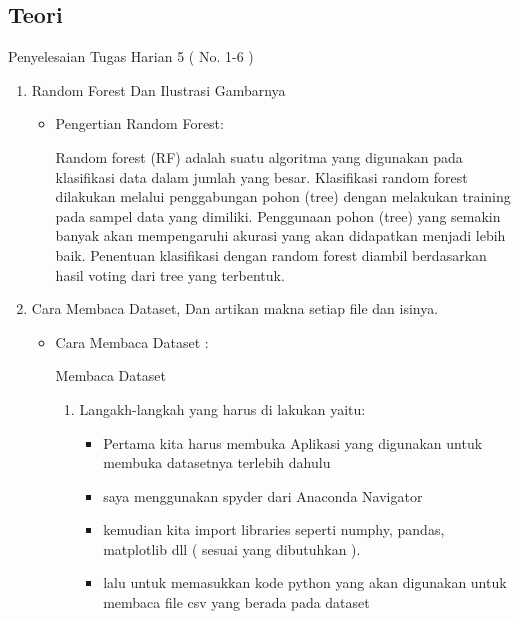 \subsection{Teori}
Penyelesaian Tugas Harian 5 ( No. 1-6 )
\begin{enumerate}
\item Random Forest Dan Ilustrasi Gambarnya
\begin{itemize}
\item Pengertian Random Forest:
\par Random forest (RF) adalah suatu algoritma yang digunakan pada klasifikasi data dalam jumlah yang besar. Klasifikasi random forest dilakukan melalui penggabungan pohon (tree) dengan melakukan training pada sampel data yang dimiliki. Penggunaan pohon (tree) yang semakin banyak akan mempengaruhi akurasi yang akan didapatkan menjadi lebih baik. Penentuan klasifikasi dengan random forest diambil berdasarkan hasil voting dari tree yang terbentuk.

\par
\end{itemize}
\item Cara Membaca Dataset, Dan artikan makna setiap file dan isinya.
\begin{itemize}
\item Cara Membaca Dataset :
\par Membaca Dataset
\begin{enumerate}
\item Langakh-langkah  yang harus di lakukan yaitu:
\begin{itemize}
\item Pertama kita harus membuka Aplikasi yang digunakan untuk membuka datasetnya terlebih dahulu 
\item saya menggunakan spyder dari Anaconda Navigator
\item kemudian kita import libraries seperti numphy, pandas, matplotlib dll ( sesuai yang dibutuhkan ).
\item lalu untuk memasukkan kode python yang akan digunakan untuk membaca file csv yang berada pada dataset 



\end{itemize}
\end{enumerate}
\end{itemize}
\end{enumerate}
